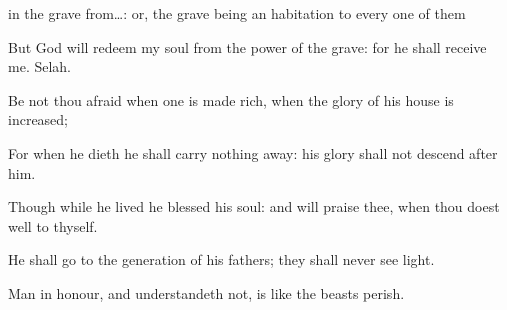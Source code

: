 {{in the grave from…: or, the grave being an habitation to every one of them}
\par }{\BB \par }{\Q {}But
God will
redeem my
soul from the
power of the
grave: for he shall
receive me.
Selah.
\par }{\Q {}Be not thou
afraid when
one is made
rich, when the
glory of his
house is
increased;
\par }{\Q {}For when he
dieth he shall carry nothing
away: his
glory shall not
descend
after him.
\par }{\Q {}Though while he
lived he
blessed his
soul: and
{} will
praise thee, when thou doest
well to thyself.
\par }{\Q {}He shall
go to the
generation of his
fathers; they shall
never
see
light.
\par }{\Q {}Man
{} in
honour, and
understandeth not, is
like the
beasts
{}
perish.

}
